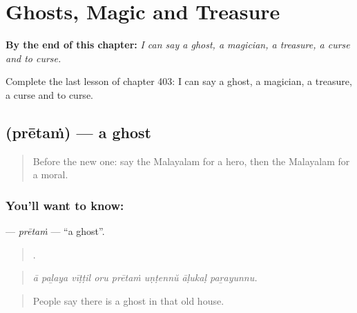 
\chapter{Ghosts, Magic and Treasure}
\label{ch:ml-ghosts-magic-and-treasure}

\begin{chapteropening}
\textbf{By the end of this chapter:} \emph{I can say a ghost, a magician, a treasure, a curse and to curse.}

Complete the last lesson of chapter 403: I can say a ghost, a magician, a treasure, a curse and to curse.
\end{chapteropening}

\section[\texorpdfstring{\ml{പ്രേതം} (prētaṁ)}{പ്രേതം (prētaṁ)}]{ (prētaṁ) — a ghost}

\label{lesson:ML-C403-pretam}



\begin{quote}
Before the new one: say the Malayalam for a hero, then the Malayalam for a moral.
\end{quote}

\subsection*{You'll want to know: }
\textbf{} — \emph{prētaṁ} — \textquotedblleft{}a ghost\textquotedblright{}.

\begin{quote}
       .
\end{quote}

\begin{quote}
\emph{ā paḻaya vīṭṭil oru prētaṁ uṇṭennŭ āḷukaḷ paṟayunnu.}
\end{quote}

\begin{quote}
People say there is a ghost in that old house.
\end{quote}


